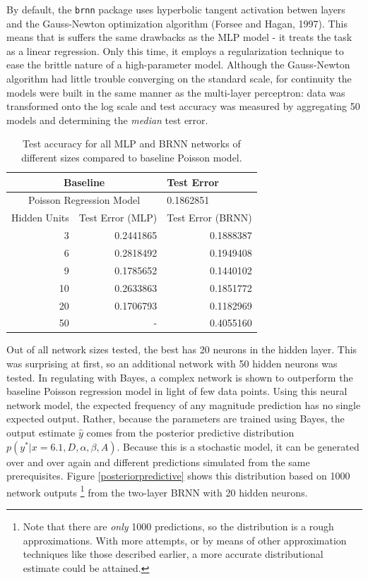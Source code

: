 By default, the \texttt{brnn} package uses hyperbolic tangent activation betwen layers and the Gauss-Newton optimization algorithm (Forsee and Hagan, 1997).  This means that is suffers the same drawbacks as the MLP model - it treats the task as a linear regression.  Only this time, it employs a regularization technique to ease the brittle nature of a high-parameter model.
Although the Gauss-Newton algorithm had little trouble converging on the standard scale, for continuity the models were built in the same manner as the multi-layer perceptron: data was transformed onto the log scale and test accuracy was measured by aggregating 50 models and determining the \textit{median} test error.

\begin{table}[ht]
\centering
\begin{tabular}{rrr}
  \hline
\multicolumn{2}{c}{Baseline} & \multicolumn{1}{l}{Test Error} \\ 
  \hline
  \multicolumn{2}{c}{Poisson Regression Model} & \multicolumn{1}{l}{0.1862851} \\ 
  \hline
Hidden Units & Test Error (MLP) & Test Error (BRNN) \\ 
  \hline
3 & 0.2441865  & 0.1888387 \\ 
6 & 0.2818492  & 0.1949408 \\ 
9 & 0.1785652  & 0.1440102 \\ 
10 & 0.2633863  & 0.1851772 \\ 
20 & 0.1706793  & 0.1182969 \\ 
 50 & - & 0.4055160 \\ 
   \hline
\end{tabular}
   \caption{Test accuracy for all MLP and BRNN networks of different sizes compared to baseline Poisson model.}
\end{table}



Out of all network sizes tested, the best has 20 neurons in the hidden layer.  This was surprising at first, so an additional network with 50 hidden neurons was tested.  In regulating with Bayes, a complex network is shown to outperform the baseline Poisson regression model in light of few data points.  Using this neural network model, the expected frequency of any magnitude prediction has no single expected output.  Rather, because the parameters are trained using Bayes, the output estimate $\hat{y}$ comes from the posterior predictive distribution $p(y^*|x=6.1,D,\alpha,\beta,A)$.  Because this is a stochastic model, it can be generated over and over again and different predictions simulated from the same prerequisites.  Figure \ref{posteriorpredictive} shows this distribution based on 1000 network outputs 
\footnote{Note that there are \textit{only} 1000 predictions, so the distribution is a rough approximations.  With more attempts, or by means of other approximation techniques like those described earlier, a more accurate distributional estimate could be attained.}
 from the two-layer BRNN with 20 hidden neurons.

